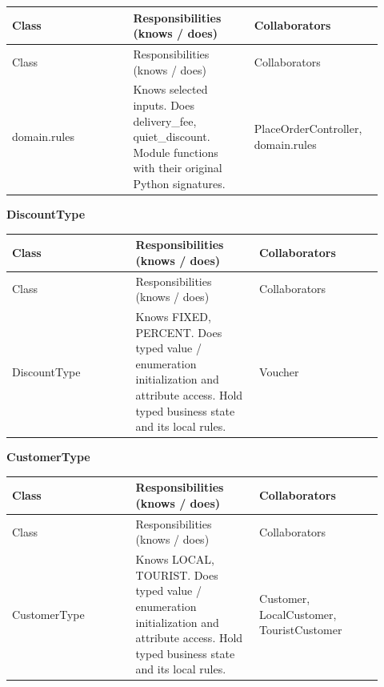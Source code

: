 \begin{longtable}{>{\raggedright\arraybackslash}p{0.3067\linewidth}>{\raggedright\arraybackslash}p{0.3067\linewidth}>{\raggedright\arraybackslash}p{0.3067\linewidth}}
Class & Responsibilities (knows / does) & Collaborators \\
\hline\endfirsthead
Class & Responsibilities (knows / does) & Collaborators \\
\hline\endhead
domain.rules & Knows selected inputs. Does delivery\_fee, quiet\_discount. Module functions with their original Python signatures. & PlaceOrderController, domain.rules \\
\end{longtable}
\textbf{DiscountType}

\begin{longtable}{>{\raggedright\arraybackslash}p{0.3067\linewidth}>{\raggedright\arraybackslash}p{0.3067\linewidth}>{\raggedright\arraybackslash}p{0.3067\linewidth}}
Class & Responsibilities (knows / does) & Collaborators \\
\hline\endfirsthead
Class & Responsibilities (knows / does) & Collaborators \\
\hline\endhead
DiscountType & Knows FIXED, PERCENT. Does typed value / enumeration initialization and attribute access. Hold typed business state and its local rules. & Voucher \\
\end{longtable}
\textbf{CustomerType}

\begin{longtable}{>{\raggedright\arraybackslash}p{0.3067\linewidth}>{\raggedright\arraybackslash}p{0.3067\linewidth}>{\raggedright\arraybackslash}p{0.3067\linewidth}}
Class & Responsibilities (knows / does) & Collaborators \\
\hline\endfirsthead
Class & Responsibilities (knows / does) & Collaborators \\
\hline\endhead
CustomerType & Knows LOCAL, TOURIST. Does typed value / enumeration initialization and attribute access. Hold typed business state and its local rules. & Customer, LocalCustomer, TouristCustomer \\
\end{longtable}
